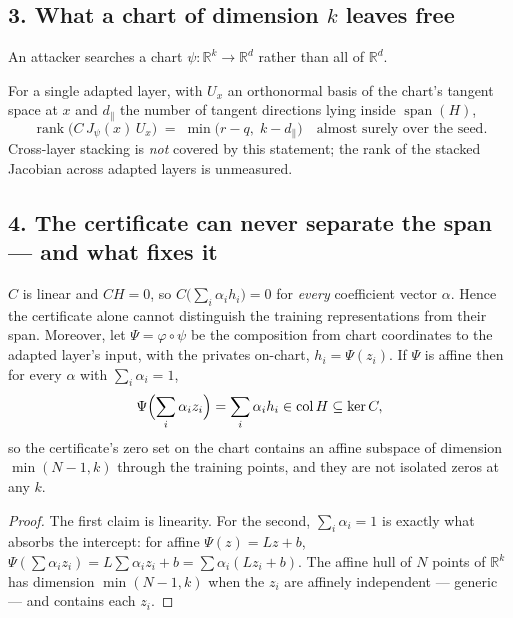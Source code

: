 \subsection*{3. What a chart of dimension $k$ leaves free}

An attacker searches a chart $\psi:\mathbb R^{k}\to\mathbb R^{d}$ rather than all of $\mathbb R^d$.

\begin{theorem}\label{thm:tangent}
For a single adapted layer, with $U_x$ an orthonormal basis of the chart's tangent space at $x$ and
$d_\parallel$ the number of tangent directions lying inside $\operatorname{span}(H)$,
\[
  \operatorname{rank}\bigl(C\,J_\psi(x)\,U_x\bigr)\;=\;\min\bigl(r-q,\;k-d_\parallel\bigr)
  \quad\text{almost surely over the seed.}
\]
Cross-layer stacking is \emph{not} covered by this statement; the rank of the stacked Jacobian across
adapted layers is unmeasured.
\end{theorem}

\subsection*{4. The certificate can never separate the span --- and what fixes it}

\begin{lemma}\label{lem:hull}
$C$ is linear and $CH=0$, so $C\bigl(\sum_i\alpha_ih_i\bigr)=0$ for \emph{every} coefficient vector
$\alpha$. Hence the certificate alone cannot distinguish the training representations from their
span. Moreover, let $\Psi=\varphi\circ\psi$ be the composition from chart coordinates to the adapted
layer's input, with the privates on-chart, $h_i=\Psi(z_i)$. If $\Psi$ is affine then for every
$\alpha$ with $\sum_i\alpha_i=1$,
\[
  \Psi\Bigl(\sum_i\alpha_iz_i\Bigr)=\sum_i\alpha_ih_i\in\operatorname{col}H\subseteq\ker C ,
\]
so the certificate's zero set on the chart contains an affine subspace of dimension $\min(N-1,k)$
through the training points, and they are not isolated zeros at any $k$.
\end{lemma}

\begin{proof}
The first claim is linearity. For the second, $\sum_i\alpha_i=1$ is exactly what absorbs the
intercept: for affine $\Psi(z)=Lz+b$, $\Psi(\sum\alpha_iz_i)=L\sum\alpha_iz_i+b=\sum\alpha_i(Lz_i+b)$.
The affine hull of $N$ points of $\mathbb R^k$ has dimension $\min(N-1,k)$ when the $z_i$ are
affinely independent --- generic --- and contains each $z_i$.
\end{proof}

